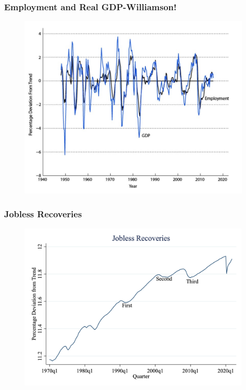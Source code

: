 \documentclass{beamer}
\begin{document}
\begin{frame}
\frametitle[alignment=center]{Employment and Real GDP-Williamson!}
\begin{figure}
\centering
\includegraphics[scale=0.25]{Figures/W_Fig_3pt13.png}
\end{figure}
\end{frame}



\begin{frame}
\frametitle[alignment=center]{Jobless Recoveries}
\begin{figure}
\centering
\includegraphics[scale=0.25]{Figures/Fig_3pt14.png}
\end{figure}
\end{frame}
\end{document}
